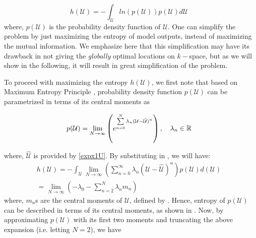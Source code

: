 \documentclass{article}         %
\theoremstyle{definition}
\theoremstyle{remark}
\begin{document}
\begin{equation}\label{entropy}
h(\mathcal{U})=-\int_{\mathcal{U}} ln\left(p(\mathcal{U})\right)p(\mathcal{U})d\mathcal{U}
\end{equation}
where, $p(\mathcal{U})$ is the probability density function of $\mathcal{U}$. %
One can simplify the problem by just maximizing the entropy of model outputs,
instead of maximizing the mutual information. We emphasize here that this
simplification may have its drawback in not giving the \textit{globally}
optimal locations on $k-$space, but as we will show in the following, it will
result in great simplification of the problem. 

To proceed with maximizing the entropy $h(\mathcal{U})$, we first note that
based on Maximum Entropy Principle \cite{cover2012elements}, probability
density function $p(\mathcal{U})$ can be parametrized in terms of its central
moments as

\begin{equation}\label{pu_entropy}
p(\mathcal{U})=\lim_{N\rightarrow \infty} \left(e^{\sum\limits_{n=0}^N \lambda_n (\mathcal{U}-\hat{\mathcal{U}})^n}\right),\quad \lambda_n \in \mathbb R
\end{equation}

where, $\hat{\mathcal{U}}$ is provided by \eqref{expx1U}. By substituting
 in , we will have: $  $
\begin{align}
h(\mathcal{U})=-\int_{\mathcal{U}} \lim_{N\rightarrow \infty} \left(\sum\limits_{n=0}^\infty \lambda_n (\mathcal{U}-\hat{\mathcal{U}})^n\right) p(\mathcal{U})d(\mathcal{U})\nonumber\\
= \lim_{N \rightarrow \infty} (-\lambda_0 - \sum\limits_{n=2}^{N} \lambda_n m_n) \label{entropy_moments}
\end{align}
where, $m_n$s are the central moments of $\mathcal{U}$, defined by . Hence, entropy of $p(\mathcal{U})$ can be described in terms of its central moments, as shown in . Now, by approximating $p(\mathcal{U})$ with its first two moments and truncating the above expansion (i.e. letting $N=2$), we have 
\end{document}
